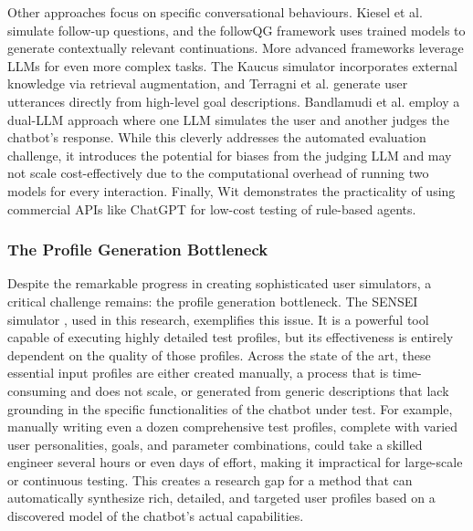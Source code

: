 Other approaches focus on specific conversational behaviours.
Kiesel et al. \autocite{kieselSimulatingFollowUpQuestions2024}
simulate follow-up questions,
and the followQG framework \autocite{bImprovingAsynchronousInterview2021}
uses trained models to generate contextually relevant continuations.
More advanced frameworks leverage \acp{LLM} for even more complex tasks.
The Kaucus simulator \autocite{dholeKAUCUSKnowledgeAugmented2024}
incorporates external knowledge via retrieval augmentation,
and Terragni et al. \autocite{terragniInContextLearningUser2023}
generate user utterances directly from high-level goal descriptions.
Bandlamudi et al. \autocite{bandlamudiFrameworkEnableTest2024}
employ a dual-\ac{LLM} approach where
one \ac{LLM} simulates the user and
another judges the chatbot's response.
While this cleverly addresses the automated evaluation challenge,
it introduces the potential for biases from the judging LLM
and may not scale cost-effectively due to the computational overhead
of running two models for every interaction.
Finally, Wit \autocite{dewitLeveragingLargeLanguage2024}
demonstrates the practicality of using commercial APIs like ChatGPT
for low-cost testing of rule-based agents.

\subsubsection{The Profile Generation Bottleneck}
Despite the remarkable progress in creating sophisticated user simulators,
a critical challenge remains: the profile generation bottleneck.
The SENSEI simulator \autocite{delaraSensei},
used in this research, exemplifies this issue.
It is a powerful tool capable of executing highly detailed test profiles,
but its effectiveness is entirely dependent on the quality of those profiles.
Across the state of the art,
these essential input profiles are either created manually,
a process that is time-consuming and does not scale,
or generated from generic descriptions
that lack grounding in the specific functionalities of the chatbot under test.
For example, manually writing even a dozen comprehensive test profiles,
complete with varied user personalities, goals, and parameter combinations,
could take a skilled engineer several hours or even days of effort,
making it impractical for large-scale or continuous testing.
This creates a research gap
for a method that can automatically synthesize
rich, detailed, and targeted user profiles
based on a discovered model of the chatbot's actual capabilities.

